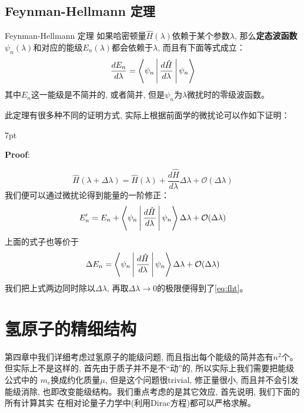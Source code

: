 \documentclass[a4paper,zihao=-4,linespread=1]{ctexrep}
\newenvironment{thinknote}{%
\def\FrameCommand{%
\hspace{1pt}%
{\color{BurlyWood}\vrule width 2pt}%
{\color{formalshade}\vrule width 4pt}%
\colorbox{formalshade}%
}%
\MakeFramed{\advance\hsize-\width\FrameRestore}%
\noindent\hspace{-4.55pt}%
\begin{adjustwidth}{}{7pt}%
\vspace{2pt}\vspace{2pt}%
}
{%
\vspace{2pt}\end{adjustwidth}\endMakeFramed%
}
\begin{document}
    \subsection*{Feynman-Hellmann 定理}
    \begin{theorem}{Feynman-Hellmann 定理}
        如果哈密顿量$\hat{H}(\lambda)$依赖于某个参数$\lambda$, 那么\textbf{定态波函数}$\psi_n(\lambda)$和对应的能级$E_n(\lambda)$都会依赖于$\lambda$, 而且有下面等式成立：
        \begin{equation}
            \label{eq:fht}
            \frac{dE_n}{d\lambda}=\Braket{\psi_n|\frac{d\hat{H}}{d\lambda}|\psi_n}
        \end{equation}
        其中$E_n$这一能级是不简并的, 或者简并, 但是$\psi_n$为$\lambda$微扰时的零级波函数。
    \end{theorem}
    
    此定理有很多种不同的证明方式, 实际上根据前面学的微扰论可以作如下证明：
    \begin{thinknote}
        \textbf{Proof}:

            \begin{equation*}
                \hat{H}(\lambda+\Delta\lambda)=\hat{H}(\lambda)+\frac{d\hat{H}}{d\lambda}\Delta\lambda+\mathcal{O}(\Delta\lambda)
            \end{equation*}
            我们便可以通过微扰论得到能量的一阶修正：
            \begin{equation*}
                E_n^\prime=E_n+\Braket{\psi_n|\frac{d\hat{H}}{d\lambda}|\psi_n}\Delta\lambda+\mathcal{O}(\Delta\lambda)
            \end{equation*}
            上面的式子也等价于
            \begin{equation*}
                \Delta E_n=\Braket{\psi_n|\frac{d\hat{H}}{d\lambda}|\psi_n}\Delta\lambda+\mathcal{O}(\Delta\lambda)
            \end{equation*}
            我们把上式两边同时除以$\Delta\lambda$, 再取$\Delta\lambda\to 0$的极限便得到了\ref{eq:fht}。
    \end{thinknote}

    \section{氢原子的精细结构}
    第四章中我们详细考虑过氢原子的能级问题, 而且指出每个能级的简并态有$n^2$个。但实际上不是这样的, 首先由于质子并不是不“动”的, 所以实际上我们需要把能级公式中的
    $m_e$换成约化质量$\mu$, 但是这个问题很trivial, 修正量很小, 而且并不会引发能级消除, 也即改变能级结构。我们重点考虑的是其它效应, 首先说明, 我们下面的所有计算其实
    在相对论量子力学中(利用Dirac方程)都可以严格求解。
\end{document}

